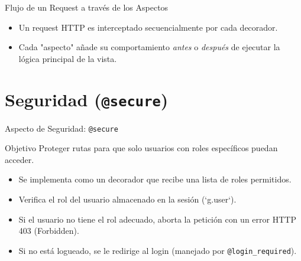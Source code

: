 \documentclass[spanish]{beamer}
\begin{document}
\begin{frame}{Flujo de un Request a través de los Aspectos}
    \centering
    \vfill
    \begin{itemize}
        \item Un request HTTP es interceptado secuencialmente por cada decorador.
        \item Cada "aspecto" añade su comportamiento \textit{antes} o \textit{después} de ejecutar la lógica principal de la vista.
    \end{itemize}
\end{frame}

\section{Seguridad (\texttt{@secure})}

\begin{frame}{Aspecto de Seguridad: \texttt{@secure}}
    \begin{block}{Objetivo}
        Proteger rutas para que solo usuarios con roles específicos puedan acceder.
    \end{block}

    \begin{itemize}
        \item Se implementa como un decorador que recibe una lista de roles permitidos.
        \item Verifica el rol del usuario almacenado en la sesión (`g.user`).
        \item Si el usuario no tiene el rol adecuado, aborta la petición con un error HTTP 403 (Forbidden).
        \item Si no está logueado, se le redirige al login (manejado por \texttt{@login\_required}).
    \end{itemize}
\end{frame}
\end{document}
